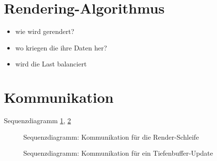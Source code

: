 \section{Rendering-Algorithmus}
\label{sec:impl:renderalgo}
%
\begin{itemize}
 \item wie wird gerendert?
 \item wo kriegen die ihre Daten her?
 \item wird die Last balanciert
\end{itemize}

\section{Kommunikation}
\label{sec:impl:kommunikation}
%
Sequenzdiagramm \ref{fig:impl:seqdiagrender}, \ref{fig:impl:seqdiagdepth}

\begin{figure}

  \caption{Sequenzdiagramm: Kommunikation für die Render-Schleife}
  \label{fig:impl:seqdiagrender}
\end{figure}

\begin{figure}

  \caption{Sequenzdiagramm: Kommunikation für ein Tiefenbuffer-Update}
  \label{fig:impl:seqdiagdepth}
\end{figure}

%
%
